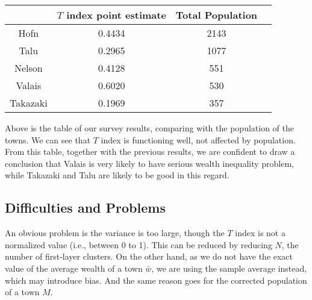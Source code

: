 \documentclass[12pt]{article}%
\begin{document}
\begin{center}
        \begin{tabular}{ | c | c | c | c |}
            \hline
                 & $T$ index point estimate 	& Total Population	  \\ 
            \hline
            Hofn 	 & 0.4434		& 2143	 \\ 
            \hline 
            Talu     & 0.2965 		& 1077	 \\ 
            \hline 
            Nelson   & 0.4128 		& 551	 \\ 
            \hline 
            Valais   & 0.6020 		& 530	 \\ 
            \hline 
            Takazaki & 0.1969 		& 357	 \\ 
            \hline
        \end{tabular}
\end{center}

Above is the table of our survey results, 
comparing with the population of the towns. 
We can see that $T$ index is functioning well, not affected by population.
From this table, together with the previous results, 
we are confident to draw a conclusion that Valais is very likely to  
have serious wealth inequality problem, 
while Takazaki and Talu are likely to be good in this regard.

\subsection{Difficulties and Problems}
An obvious problem is the variance is too large, 
though the $T$ index is not a normalized value (i.e., between 0 to 1).
This can be reduced by reducing $N$, the number of first-layer clusters. 
On the other hand, as we do not have the exact value 
of the average wealth of a town $\bar{w}$, 
we are using the sample average instead,
which may introduce bias. 
And the same reason goes for the corrected population of a town $M$.
\end{document}
